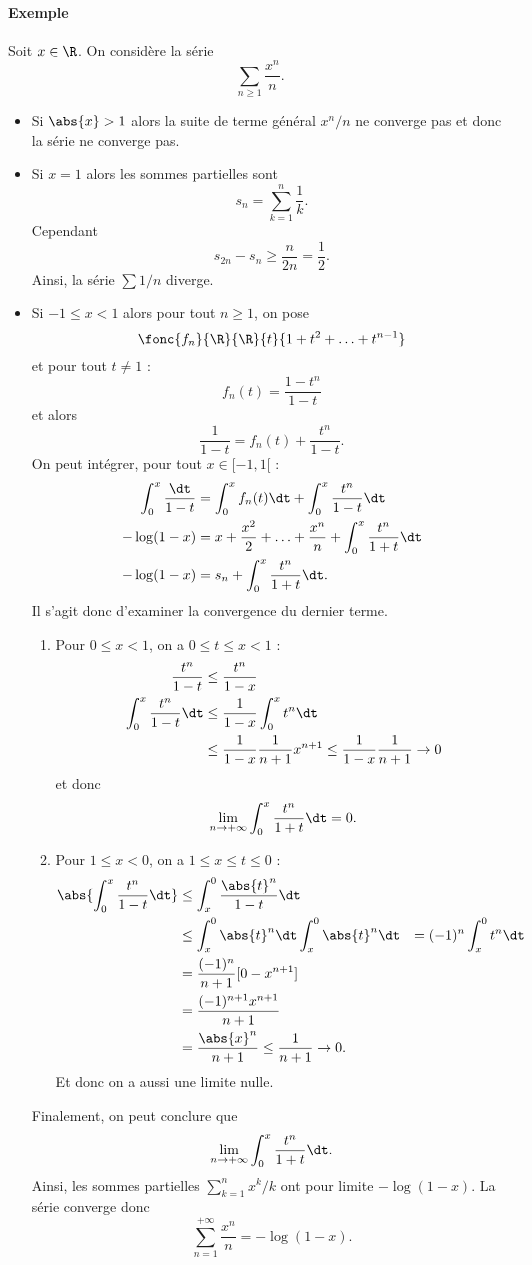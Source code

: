 \documentclass{livre}
\begin{document}
\paragraph{Exemple}Soit $x\in \R$. On considère la série \[ \sum_{n\geq 1}\frac{x^{n}}{n}.\]
\begin{itemize}
\item Si $\abs{x}>1$ alors la suite de terme général $x^{n}/n$ ne converge pas et donc la série ne converge pas.
\item Si $x=1$ alors les sommes partielles sont \[ s_n = \sum_{k=1}^{n}\frac{1}{k}.\]Cependant \[ s_{2n} - s_n \geq \frac{n}{2n} = \frac{1}{2}.\]Ainsi, la série $\sum 1/n$ diverge.
\item Si $-1\leq x<1$ alors pour tout $n\geq 1$, on pose \[ \fonc{f_n}{\R}{\R}{t}{1+t^{2}+\ldots+t^{n-1}}\]et pour tout $t\neq 1$ : \[f_{n}(t) = \frac{1-t^{n}}{1-t} \]et alors \[\frac{1}{1-t}= f_n(t) + \frac{t^{n}}{1-t}. \]On peut intégrer, pour tout $x\in[-1,1[$ : 
\begin{align*}
\int_{0}^{x}\frac{\dt}{1-t} &= \int_{0}^{x}f_n(t)\dt + \int_{0}^{x}\frac{t^{n}}{1-t}\dt\\
-\log(1-x) &= x + \frac{x^{2}}{2} +\ldots + \frac{x^{n}}{n} + \int_{0}^{x}\frac{t^{n}}{1+t}\dt\\
-\log(1-x) &= s_n+ \int_{0}^{x}\frac{t^{n}}{1+t}\dt.
\end{align*}
Il s'agit donc d'examiner la convergence du dernier terme. 
\begin{enumerate}
\item Pour $0\leq x < 1$, on a $0\leq t \leq x < 1$ : 
\begin{align*}
\frac{t^{n}}{1-t} &\leq \frac{t^{n}}{1-x} \\
\int_{0}^{x}\frac{t^{n}}{1-t}\dt &\leq \frac{1}{1-x}\int_{0}^{x}t^{n}\dt \\
&\leq \frac{1}{1-x}\frac{1}{n+1}x^{n+1}\leq \frac{1}{1-x}\frac{1}{n+1} \to 0
\end{align*}
et donc \[ \lim_{n\to+\infty} \int_{0}^{x}\frac{t^{n}}{1+t}\dt = 0. \]
\item Pour $1\leq x < 0$, on a $1\leq x \leq t \leq 0$ :
\begin{align*}
\abs{\int_{0}^{x}\frac{t^{n}}{1-t}\dt} &\leq \int_{x}^{0}\frac{\abs{t}^{n}}{1-t}\dt \\
&\leq \int_{x}^{0}\abs{t}^{n}\dt 
\int_{x}^{0}\abs{t}^{n}\dt &= (-1)^{n}\int_{x}^{0}t^{n}\dt \\
&= \frac{(-1)^{n}}{n+1}[ 0 -x^{n+1}] \\
&= \frac{(-1)^{n+1}x^{n+1}}{n+1}\\
&= \frac{\abs{x}^{n}}{n+1} \leq \frac{1}{n+1}\to 0.
\end{align*}
Et donc on a aussi une limite nulle.
\end{enumerate}
Finalement, on peut conclure que \[\lim_{n\to +\infty} \int_{0}^{x}\frac{t^{n}}{1+t}\dt. \]Ainsi, les sommes partielles $\sum_{k=1}^{n}x^{k}/k$ ont pour limite $-\log(1-x)$. La série converge donc \[ \sum_{n=1}^{+\infty}\frac{x^{n}}{n} = -\log(1-x).\]
\end{itemize}
\end{document}
